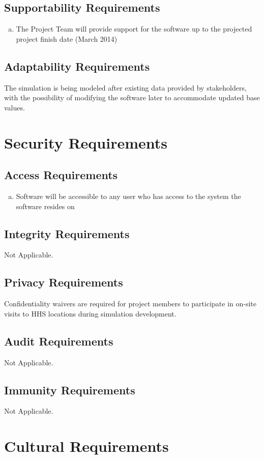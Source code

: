\documentclass[paper=letter, fontsize=10pt]{scrartcl}
\numberwithin{equation}{section}		%
\numberwithin{figure}{section}			%
\numberwithin{table}{section}				%
\begin{document}
\subsection{Supportability Requirements}
	\begin{enumerate}[(a)]
		\item The Project Team will provide support for the software up to the projected project finish date (March 2014)
	\end{enumerate}
\subsection{Adaptability Requirements}
The simulation is being modeled after existing data provided by stakeholders, with the possibility of modifying the software later to accommodate updated base values. 

\section{Security Requirements}
\subsection{Access Requirements}
	\begin{enumerate}[(a)]
		\item Software will be accessible to any user who has access to the system the software resides on
	\end{enumerate}
\subsection{Integrity Requirements}
Not Applicable.
\subsection{Privacy Requirements}
Confidentiality waivers are required for project members to participate in on-site visits to HHS locations during simulation development.
\subsection{Audit Requirements}
Not Applicable.
\subsection{Immunity Requirements}
Not Applicable.

\section{Cultural Requirements}
\end{document}
